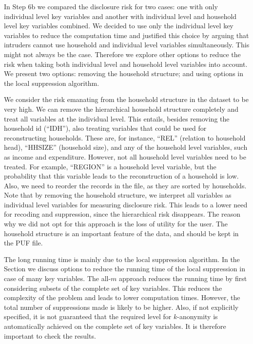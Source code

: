 \documentclass[letterpaper,10pt,english]{sphinxmanual}
\begin{document}

In Step 6b we compared the disclosure risk for two cases: one with only
individual level key variables and another with individual level and
household level key variables combined. We decided to use only the
individual level key variables to reduce the computation time and
justified this choice by arguing that intruders cannot use household and
individual level variables simultaneously. This might not always be the
case. Therefore we explore other options to reduce the risk when taking
both individual level and household level variables into account. We
present two options: removing the household structure; and using options
in the local suppression algorithm.


We consider the risk emanating from the household structure in the
dataset to be very high. We can remove the hierarchical household
structure completely and treat all variables at the individual level.
This entails, besides removing the household id (“IDH”), also treating
variables that could be used for reconstructing households. These are,
for instance, “REL” (relation to household head), “HHSIZE” (household
size), and any of the household level variables, such as income and
expenditure. However, not all household level variables need to be
treated. For example, “REGION” is a household level variable, but the
probability that this variable leads to the reconstruction of a
household is low. Also, we need to reorder the records in the file, as
they are sorted by households. Note that by removing the household
structure, we interpret all variables as individual level variables for
measuring disclosure risk. This leads to a lower need for recoding and
suppression, since the hierarchical risk disappears. The reason why we
did not opt for this approach is the loss of utility for the user. The
household structure is an important feature of the data, and should be
kept in the PUF file.


The long running time is mainly due to the local suppression algorithm.
In the Section 
we discuss options to reduce the running time of the
local suppression in case of many key variables. The all-\(m\)
approach reduces the running time by first considering subsets of the
complete set of key variables. This reduces the complexity of the
problem and leads to lower computation times. However, the total number
of suppressions made is likely to be higher. Also, if not explicitly
specified, it is not guaranteed that the required level for
\(k\)-anonymity is automatically achieved on the complete set of key
variables. It is therefore important to check the results.
\end{document}
